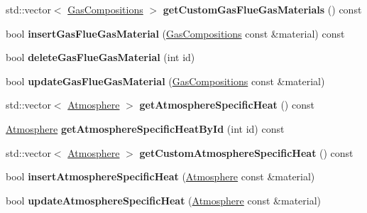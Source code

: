 \begin{DoxyCompactItemize}
\item 
\mbox{\label{class_s_q_lite_a8cd9d62714f1083bab16e388dabc59be}} 
std\+::vector$<$ \hyperlink{class_gas_compositions}{Gas\+Compositions} $>$ {\bfseries get\+Custom\+Gas\+Flue\+Gas\+Materials} () const
\item 
\mbox{\label{class_s_q_lite_a95d5521ed0de19c979ac9627ae21fbcd}} 
bool {\bfseries insert\+Gas\+Flue\+Gas\+Material} (\hyperlink{class_gas_compositions}{Gas\+Compositions} const \&material) const
\item 
\mbox{\label{class_s_q_lite_a12b38db00e6d8bcff8345e7300a67b26}} 
bool {\bfseries delete\+Gas\+Flue\+Gas\+Material} (int id)
\item 
\mbox{\label{class_s_q_lite_a71c1973e285ccae25b7bb8dbc101770e}} 
bool {\bfseries update\+Gas\+Flue\+Gas\+Material} (\hyperlink{class_gas_compositions}{Gas\+Compositions} const \&material)
\item 
\mbox{\label{class_s_q_lite_a04d22b056b51fb07d192833806eabdfc}} 
std\+::vector$<$ \hyperlink{class_atmosphere}{Atmosphere} $>$ {\bfseries get\+Atmosphere\+Specific\+Heat} () const
\item 
\mbox{\label{class_s_q_lite_ae468835cffed182bb9819299463c53b7}} 
\hyperlink{class_atmosphere}{Atmosphere} {\bfseries get\+Atmosphere\+Specific\+Heat\+By\+Id} (int id) const
\item 
\mbox{\label{class_s_q_lite_adecfb81514a3fa09237baa50b2edf5e7}} 
std\+::vector$<$ \hyperlink{class_atmosphere}{Atmosphere} $>$ {\bfseries get\+Custom\+Atmosphere\+Specific\+Heat} () const
\item 
\mbox{\label{class_s_q_lite_a5be90371486d63abd80668c19682051b}} 
bool {\bfseries insert\+Atmosphere\+Specific\+Heat} (\hyperlink{class_atmosphere}{Atmosphere} const \&material)
\item 
\mbox{\label{class_s_q_lite_a0980ef2dfdaadb27f86342f983019bb7}} 
bool {\bfseries update\+Atmosphere\+Specific\+Heat} (\hyperlink{class_atmosphere}{Atmosphere} const \&material)
\item 

\end{DoxyCompactItemize}
